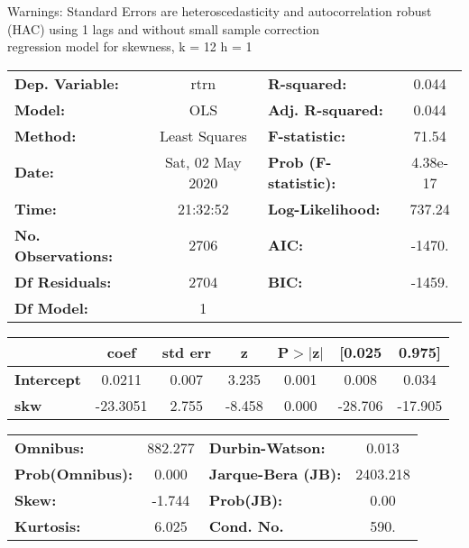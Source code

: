 Warnings: \newline
 [1] Standard Errors are heteroscedasticity and autocorrelation robust (HAC) using 1 lags and without small sample correction\\ 

regression model for skewness, k = 12 h = 1\begin{center}
\begin{tabular}{lclc}
\toprule
\textbf{Dep. Variable:}    &       rtrn       & \textbf{  R-squared:         } &     0.044   \\
\textbf{Model:}            &       OLS        & \textbf{  Adj. R-squared:    } &     0.044   \\
\textbf{Method:}           &  Least Squares   & \textbf{  F-statistic:       } &     71.54   \\
\textbf{Date:}             & Sat, 02 May 2020 & \textbf{  Prob (F-statistic):} &  4.38e-17   \\
\textbf{Time:}             &     21:32:52     & \textbf{  Log-Likelihood:    } &    737.24   \\
\textbf{No. Observations:} &        2706      & \textbf{  AIC:               } &    -1470.   \\
\textbf{Df Residuals:}     &        2704      & \textbf{  BIC:               } &    -1459.   \\
\textbf{Df Model:}         &           1      & \textbf{                     } &             \\
\bottomrule
\end{tabular}
\begin{tabular}{lcccccc}
                   & \textbf{coef} & \textbf{std err} & \textbf{z} & \textbf{P$> |$z$|$} & \textbf{[0.025} & \textbf{0.975]}  \\
\midrule
\textbf{Intercept} &       0.0211  &        0.007     &     3.235  &         0.001        &        0.008    &        0.034     \\
\textbf{skw}       &     -23.3051  &        2.755     &    -8.458  &         0.000        &      -28.706    &      -17.905     \\
\bottomrule
\end{tabular}
\begin{tabular}{lclc}
\textbf{Omnibus:}       & 882.277 & \textbf{  Durbin-Watson:     } &    0.013  \\
\textbf{Prob(Omnibus):} &   0.000 & \textbf{  Jarque-Bera (JB):  } & 2403.218  \\
\textbf{Skew:}          &  -1.744 & \textbf{  Prob(JB):          } &     0.00  \\
\textbf{Kurtosis:}      &   6.025 & \textbf{  Cond. No.          } &     590.  \\
\bottomrule
\end{tabular}
\end{center}

